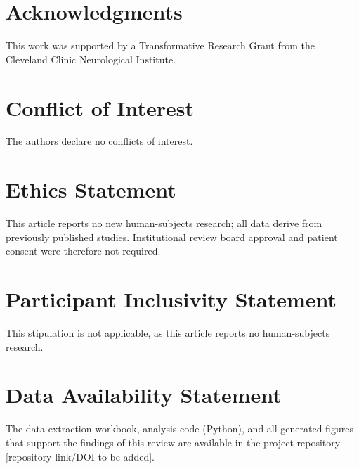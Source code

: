 \documentclass[12pt]{article}
\begin{document}
\section*{Acknowledgments}
This work was supported by a Transformative Research Grant from the Cleveland Clinic Neurological Institute.

\section*{Conflict of Interest}
The authors declare no conflicts of interest.

\section*{Ethics Statement}
This article reports no new human-subjects research; all data derive from
previously published studies. Institutional review board approval and patient
consent were therefore not required.

\section*{Participant Inclusivity Statement}
This stipulation is not applicable, as this article reports no human-subjects
research.

\section*{Data Availability Statement}
The data-extraction workbook, analysis code (Python), and all generated figures
that support the findings of this review are available in the project repository
[repository link/DOI to be added].



\end{document}
